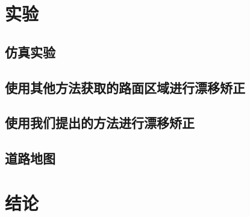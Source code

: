\section{实验}
\subsection{仿真实验}
\subsection{使用其他方法获取的路面区域进行漂移矫正}

\iffalse
\begin{figure}[h]
\centering
\subfigure[]{\label{fig:cor_res_0}
\texttt{[image: images/correct\_result/correct\_1.png]}
}
\subfigure[]{\label{fig:cor_res_1}
\texttt{[image: images/correct\_result/correct\_4.png]}
}
\subfigure[]{\label{fig:cor_res_2}
\texttt{[image: images/correct\_result/no\_correct\_1.png]}
}
\subfigure[]{\label{fig:corrected_09}
\texttt{[image: images/corrected\_09.pdf]}
}
\caption{矫正可视化}
{\label{fig:path_cor_res}}
\end{figure}
\fi
\subsection{使用我们提出的方法进行漂移矫正}

\subsection{道路地图}
\section{结论}